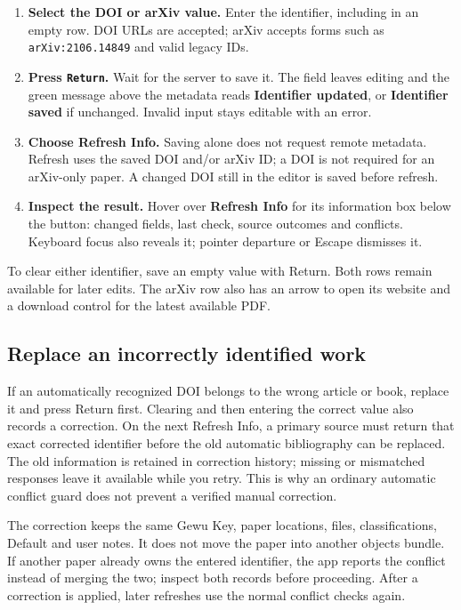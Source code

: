 \documentclass[10pt,letterpaper,oneside]{scrreprt}
\providecommand{\tightlist}{\setlength{\itemsep}{1pt}\setlength{\parskip}{0pt}}
\begin{document}
\begin{enumerate}
\tightlist
\item
  \textbf{Select the DOI or arXiv value.} Enter the identifier, including in an empty row. DOI URLs are accepted; arXiv accepts forms such as \texttt{arXiv:2106.14849} and valid legacy IDs.
\item
  \textbf{Press \texttt{Return}.} Wait for the server to save it. The field leaves editing and the green message above the metadata reads \textbf{Identifier updated}, or \textbf{Identifier saved} if unchanged. Invalid input stays editable with an error.
\item
  \textbf{Choose \textbf{Refresh Info}.} Saving alone does not request remote metadata. Refresh uses the saved DOI and/or arXiv ID; a DOI is not required for an arXiv-only paper. A changed DOI still in the editor is saved before refresh.
\item
  \textbf{Inspect the result.} Hover over \textbf{Refresh Info} for its information box below the button: changed fields, last check, source outcomes and conflicts. Keyboard focus also reveals it; pointer departure or Escape dismisses it.
\end{enumerate}

To clear either identifier, save an empty value with Return. Both rows remain available for later edits. The arXiv row also has an arrow to open its website and a download control for the latest available PDF.

\subsection{Replace an incorrectly identified work}\label{replace-an-incorrectly-identified-work}

If an automatically recognized DOI belongs to the wrong article or book, replace it and press Return first. Clearing and then entering the correct value also records a correction. On the next Refresh Info, a primary source must return that exact corrected identifier before the old automatic bibliography can be replaced. The old information is retained in correction history; missing or mismatched responses leave it available while you retry. This is why an ordinary automatic conflict guard does not prevent a verified manual correction.

The correction keeps the same Gewu Key, paper locations, files, classifications, Default and user notes. It does not move the paper into another object\textquotesingle s bundle. If another paper already owns the entered identifier, the app reports the conflict instead of merging the two; inspect both records before proceeding. After a correction is applied, later refreshes use the normal conflict checks again.
\end{document}
